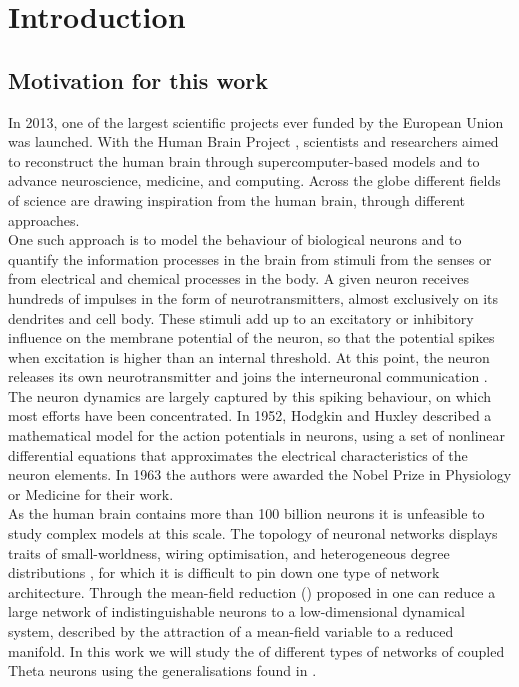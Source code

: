 \newpage
\section{Introduction}
\subsection{Motivation for this work}
In 2013, one of the largest scientific projects ever funded by the European Union was launched. With the Human Brain Project \cite{humanbrainproject}, scientists and researchers aimed to reconstruct the human brain through supercomputer-based models and to advance neuroscience, medicine, and computing. Across the globe different fields of science are drawing inspiration from the human brain, through different approaches. \\
One such approach is to model the behaviour of biological neurons and to quantify the information processes in the brain from stimuli from the senses or from electrical and chemical processes in the body. A given neuron receives hundreds of impulses in the form of neurotransmitters, almost exclusively on its dendrites and cell body. These stimuli add up to an excitatory or inhibitory influence on the membrane potential of the neuron, so that the potential spikes when excitation is higher than an internal threshold. At this point, the neuron releases its own neurotransmitter and joins the interneuronal communication \cite{IntroductionModelingDynamics}. The neuron dynamics are largely captured by this spiking behaviour, on which most efforts have been concentrated.
In 1952, Hodgkin and Huxley described a mathematical model for the action potentials in neurons, using a set of nonlinear differential equations that approximates the electrical characteristics of the neuron elements. In 1963 the authors were awarded the Nobel Prize in Physiology or Medicine \cite{nobel1963} for their work.\\

As the human brain contains more than 100 billion neurons \cite{Herculano2009} it is unfeasible to study complex models at this scale. The topology of neuronal networks displays traits of small-worldness, wiring optimisation, and heterogeneous degree distributions \cite{Bullmore2010}, for which it is difficult to pin down one type of network architecture. Through the mean-field reduction (\MFR) proposed in \cite{OttAntonsen2008} one can reduce a large network of indistinguishable neurons to a low-dimensional dynamical system, described by the attraction of a mean-field variable to a reduced manifold.
In this work we will study the \MFR of different types of networks of coupled Theta neurons using the generalisations found in \cite{OttAntonsen2017}.


